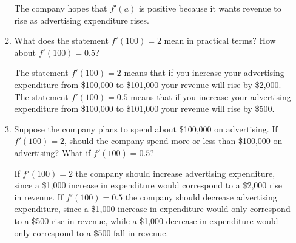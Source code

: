 \documentclass[10pt]{article}
\begin{document}
\begin{enumerate}
\begin{enumerate}
    \vfill

    {\color{blue} The company hopes that $f'(a)$ is positive because
      it wants revenue to rise as advertising expenditure rises.}

    \vfill
    
  \item What does the statement $f'(100) = 2$ mean in practical terms?
    How about $f'(100) = 0.5$?
    
    \vfill

    {\color{blue} The statement $f'(100) = 2$ means that if you
      increase your advertising expenditure from \$100,000 to
      \$101,000 your revenue will rise by \$2,000. The statement
      $f'(100) = 0.5$ means that if you increase your advertising
      expenditure from \$100,000 to \$101,000 your revenue will rise
      by \$500.}

    \vfill
    
  \item Suppose the company plans to spend about \$100,000 on
    advertising. If $f'(100)=2$, should the company spend more or less
    than \$100,000 on advertising? What if $f'(100) = 0.5$?
    
    \vfill

    {\color{blue} If $f'(100) = 2$ the company should increase
      advertising expenditure, since a \$1,000 increase in expenditure
      would correspond to a \$2,000 rise in revenue. If $f'(100) =
      0.5$ the company should decrease advertising expenditure, since
      a \$1,000 increase in expenditure would only correspond to a
      \$500 rise in revenue, while a \$1,000 decrease in expenditure
      would only correspond to a \$500 fall in revenue.}

    \vfill
    
  \end{enumerate}
  


\end{enumerate}
\end{document}
